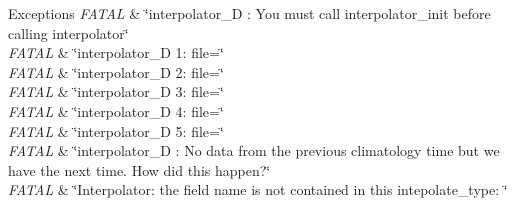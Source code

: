 \begin{DoxyExceptions}{Exceptions}
{\em F\+A\+T\+AL} & \char`\"{}interpolator\+\_\+D \+: You must call interpolator\+\_\+init
                before calling interpolator\char`\"{} \\
\hline
{\em F\+A\+T\+AL} & \char`\"{}interpolator\+\_\+D 1\+:  file=\char`\"{} \\
\hline
{\em F\+A\+T\+AL} & \char`\"{}interpolator\+\_\+D 2\+:  file=\char`\"{} \\
\hline
{\em F\+A\+T\+AL} & \char`\"{}interpolator\+\_\+D 3\+:  file=\char`\"{} \\
\hline
{\em F\+A\+T\+AL} & \char`\"{}interpolator\+\_\+D 4\+:  file=\char`\"{} \\
\hline
{\em F\+A\+T\+AL} & \char`\"{}interpolator\+\_\+D 5\+:  file=\char`\"{} \\
\hline
{\em F\+A\+T\+AL} & \char`\"{}interpolator\+\_\+D \+: No data from the previous climatology
                time but we have the next time. How did this happen?\char`\"{} \\
\hline
{\em F\+A\+T\+AL} & \char`\"{}\+Interpolator\+: the field name is not contained in this
                intepolate\+\_\+type\+: \char`\"{} \\
\hline
\end{DoxyExceptions}
\mbox{\label{interfaceinterpolator__mod_1_1interpolator_a4a8d87918b5abb9c6765a83d412557be}} 
